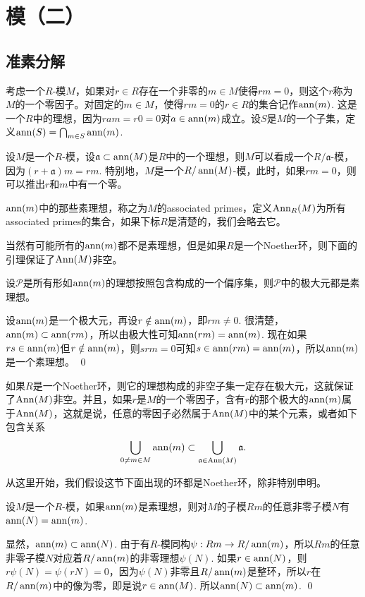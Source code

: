 \chapter{模（二）}

\section{准素分解}

\para 考虑一个$R$-模$M$，如果对$r\in R$存在一个非零的$m\in M$使得$rm=0$，则这个$r$称为$M$的一个零因子。对固定的$m\in M$，使得$rm=0$的$r\in R$的集合记作$\operatorname{ann}(m)$. 这是一个$R$中的理想，因为$ram=r0=0$对$a\in \operatorname{ann}(m)$成立。设$S$是$M$的一个子集，定义$\operatorname{ann}(S)=\bigcap_{m\in S}\operatorname{ann}(m)$.

设$M$是一个$R$-模，设$\mathfrak{a}\subset \operatorname{ann}(M)$是$R$中的一个理想，则$M$可以看成一个$R/\mathfrak{a}$-模，因为$(r+\mathfrak{a})m=rm$. 特别地，$M$是一个$R/\operatorname{ann}(M)$-模，此时，如果$rm=0$，则可以推出$r$和$m$中有一个零。

\para $\operatorname{ann}(m)$中的那些素理想，称之为$M$的associated primes，定义$\operatorname{Ann}_R(M)$为所有associated primes的集合，如果下标$R$是清楚的，我们会略去它。

当然有可能所有的$\operatorname{ann}(m)$都不是素理想，但是如果$R$是一个Noether环，则下面的引理保证了$\operatorname{Ann}(M)$非空。

\lem 设$\mathcal{P}$是所有形如$\operatorname{ann}(m)$的理想按照包含构成的一个偏序集，则$\mathcal{P}$中的极大元都是素理想。

\proof
	设$\operatorname{ann}(m)$是一个极大元，再设$r\notin \operatorname{ann}(m)$，即$rm\neq 0$. 很清楚，$\operatorname{ann}(m)\subset \operatorname{ann}(rm)$，所以由极大性可知$\operatorname{ann}(rm)=\operatorname{ann}(m)$. 现在如果$rs\in \operatorname{ann}(m)$但$r\notin \operatorname{ann}(m)$，则$srm=0$可知$s\in \operatorname{ann}(rm)=\operatorname{ann}(m)$，所以$\operatorname{ann}(m)$是一个素理想。
\qed

如果$R$是一个Noether环，则它的理想构成的非空子集一定存在极大元，这就保证了$\operatorname{Ann}(M)$非空。并且，如果$r$是$M$的一个零因子，含有$r$的那个极大的$\operatorname{ann}(m)$属于$\operatorname{Ann}(M)$，这就是说，任意的零因子必然属于$\operatorname{Ann}(M)$中的某个元素，或者如下包含关系
\[
	\bigcup_{0\neq m\in M}\operatorname{ann}(m)\subset \bigcup_{\mathfrak{a}\in \operatorname{Ann}(M)}\mathfrak{a}. 
\]

从这里开始，我们假设这节下面出现的环都是Noether环，除非特别申明。

\lem 设$M$是一个$R$-模，如果$\operatorname{ann}(m)$是素理想，则对$M$的子模$Rm$的任意非零子模$N$有$\operatorname{ann}(N)=\operatorname{ann}(m)$.

\proof
	显然，$\operatorname{ann}(m)\subset \operatorname{ann}(N)$. 由于有$R$-模同构$\psi: Rm\to R/\operatorname{ann}(m)$，所以$Rm$的任意非零子模$N$对应着$R/\operatorname{ann}(m)$的非零理想$\psi(N)$. 如果$r\in \operatorname{ann}(N)$，则$r\psi(N)=\psi(rN)=0$，因为$\psi(N)$非零且$R/\operatorname{ann}(m)$是整环，所以$r$在$R/\operatorname{ann}(m)$中的像为零，即是说$r\in \operatorname{ann}(M)$. 所以$\operatorname{ann}(N)\subset \operatorname{ann}(m)$.
\qed

